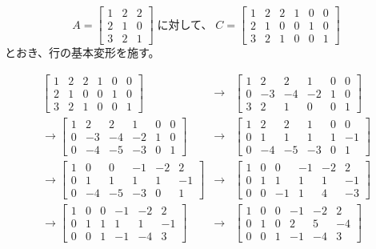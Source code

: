 \begin{eg}
$$A = \left[\begin{array}{ccc} 1 & 2 & 2 \\ 2 & 1 & 0 \\ 3 & 2 & 1 \end{array}\right] 
\;\mbox{に対して、}\; 
C = \left[\begin{array}{cccccc}1 & 2 & 2 & 1 & 0 & 0 \\ 2 & 1 & 0 & 0 & 1 & 0 \\ 3 & 2 & 1 & 0 & 0 & 1 \end{array}\right]$$
とおき、行の基本変形を施す。

\begin{eqnarray*}
\left[\begin{array}{cccccc}1 & 2 & 2 & 1 & 0 & 0 \\ 2 & 1 & 0 & 0 & 1 & 0 \\ 3 & 2 & 1 & 0 & 0 & 1 \end{array}\right] & \longrightarrow &\left[\begin{array}{cccccc}1 & 2 & 2 & 1 & 0 & 0 \\ 0 & -3 & -4 & -2 & 1 & 0 \\ 3 & 2 & 1 & 0 & 0 & 1 \end{array}\right]\\
\longrightarrow \left[\begin{array}{cccccc}1 & 2 & 2 & 1 & 0 & 0 \\ 0 & -3 & -4 & -2 & 1 & 0 \\ 0 & -4 & -5 & -3 & 0 & 1 \end{array}\right] & \longrightarrow & 
\left[\begin{array}{cccccc}1 & 2 & 2 & 1 & 0 & 0 \\ 0 & 1 & 1 & 1 & 1 & -1 \\ 0 & -4 & -5 & -3 & 0 & 1 \end{array}\right] \\
\longrightarrow 
\left[\begin{array}{cccccc}1 & 0 & 0 & -1 & -2 & 2 \\ 0 & 1 & 1 & 1 & 1 & -1 \\ 0 & -4 & -5 & -3 & 0 & 1 \end{array}\right] & \longrightarrow &
\left[\begin{array}{cccccc}1 & 0 & 0 & -1 & -2 & 2 \\ 0 & 1 & 1 & 1 & 1 & -1 \\ 0 & 0 & -1 & 1 & 4 & -3 \end{array}\right]\\
\longrightarrow \left[\begin{array}{cccccc}1 & 0 & 0 & -1 & -2 & 2 \\ 0 & 1 & 1 & 1 & 1 & -1 \\ 0 & 0 & 1 & -1 & -4 & 3 \end{array}\right] & \longrightarrow & 
\left[\begin{array}{cccccc}1 & 0 & 0 & -1 & -2 & 2 \\ 0 & 1 & 0 & 2 & 5 & -4 \\ 0 & 0 & 1 & -1 & -4 & 3 \end{array}\right]
\end{eqnarray*}


\end{eg}
